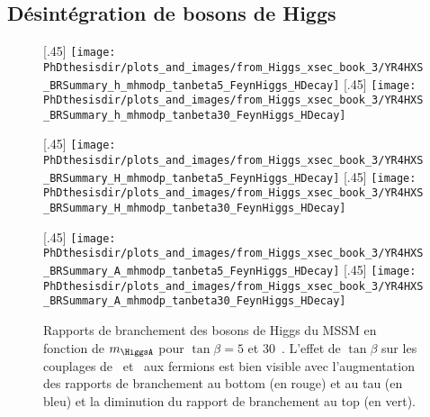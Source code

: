 \subsection{Désintégration de bosons de Higgs}\label{chapter-MS-MSSM-section-pheno_Higgs_MSSM-subsec-desintegration_Higgs}
\begin{figure}[p]
\centering
{}[.45\textwidth]
{\texttt{[image: \\PhDthesisdir/plots\_and\_images/from\_Higgs\_xsec\_book\_3/YR4HXS\_BRSummary\_h\_mhmodp\_tanbeta5\_FeynHiggs\_HDecay]}\vspace{-.5\baselineskip}}
\hfill
{}[.45\textwidth]
{\texttt{[image: \\PhDthesisdir/plots\_and\_images/from\_Higgs\_xsec\_book\_3/YR4HXS\_BRSummary\_h\_mhmodp\_tanbeta30\_FeynHiggs\_HDecay]}\vspace{-.5\baselineskip}}

\vspace{.75\baselineskip}
[.45\textwidth]
{\texttt{[image: \\PhDthesisdir/plots\_and\_images/from\_Higgs\_xsec\_book\_3/YR4HXS\_BRSummary\_H\_mhmodp\_tanbeta5\_FeynHiggs\_HDecay]}\vspace{-.5\baselineskip}}
\hfill
{}[.45\textwidth]
{\texttt{[image: \\PhDthesisdir/plots\_and\_images/from\_Higgs\_xsec\_book\_3/YR4HXS\_BRSummary\_H\_mhmodp\_tanbeta30\_FeynHiggs\_HDecay]}\vspace{-.5\baselineskip}}

\vspace{.75\baselineskip}
[.45\textwidth]
{\texttt{[image: \\PhDthesisdir/plots\_and\_images/from\_Higgs\_xsec\_book\_3/YR4HXS\_BRSummary\_A\_mhmodp\_tanbeta5\_FeynHiggs\_HDecay]}\vspace{-.5\baselineskip}}
\hfill
{}[.45\textwidth]
{\texttt{[image: \\PhDthesisdir/plots\_and\_images/from\_Higgs\_xsec\_book\_3/YR4HXS\_BRSummary\_A\_mhmodp\_tanbeta30\_FeynHiggs\_HDecay]}\vspace{-.5\baselineskip}}

\caption[Rapports de branchement des bosons de Higgs du MSSM.]{Rapports de branchement des bosons de Higgs du MSSM en fonction de $m_{\HiggsA}$ pour $\tan\beta=5$ et $30$~\cite{Higgs_xsec_book_2,Higgs_xsec_book_3}. L'effet de $\tan\beta$ sur les couplages de \Higgs\ et \HiggsA\ aux fermions est bien visible avec l'augmentation des rapports de branchement au bottom (en rouge) et au tau (en bleu) et la diminution du rapport de branchement au top (en vert).}
\label{fig-BR_hHA_tanbeta_5_30}
\end{figure}
